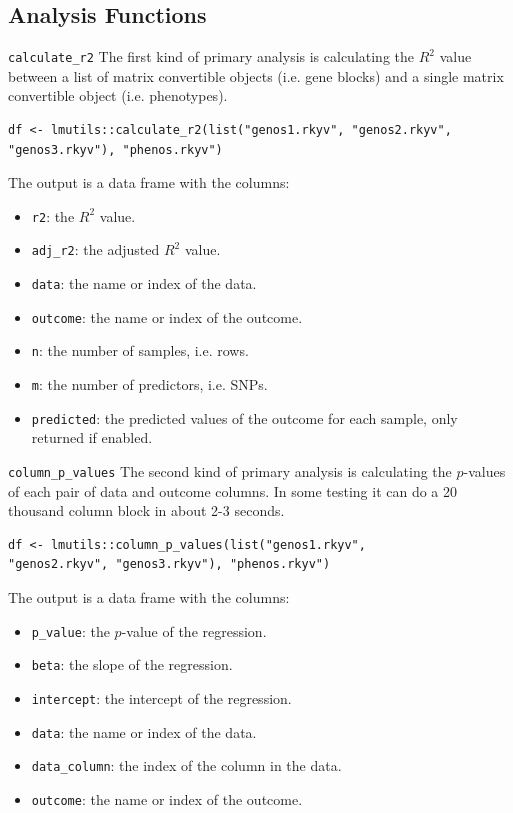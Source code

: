 \documentclass[10pt,handout]{beamer}
\begin{document}
\subsection{Analysis Functions}

\begin{frame}[fragile]{\texttt{calculate\_r2}}
  The first kind of primary analysis is calculating the $R^2$ value between a list of matrix convertible objects (i.e. gene blocks) and a single matrix convertible object (i.e. phenotypes).
\begin{verbatim}
df <- lmutils::calculate_r2(list("genos1.rkyv", "genos2.rkyv",
"genos3.rkyv"), "phenos.rkyv")
\end{verbatim}
  \pause
  The output is a data frame with the columns:
  \begin{itemize}[<+->]
    \item \texttt{r2}: the $R^2$ value.
    \item \texttt{adj\_r2}: the adjusted $R^2$ value.
    \item \texttt{data}: the name or index of the data.
    \item \texttt{outcome}: the name or index of the outcome.
    \item \texttt{n}: the number of samples, i.e. rows.
    \item \texttt{m}: the number of predictors, i.e. SNPs.
    \item \texttt{predicted}: the predicted values of the outcome for each sample, only returned if enabled.
  \end{itemize}
\end{frame}

\begin{frame}[fragile]{\texttt{column\_p\_values}}
  The second kind of primary analysis is calculating the $p$-values of each pair of data and outcome columns. In some testing it can do a 20 thousand column block in about 2-3 seconds.
  \begin{verbatim}
df <- lmutils::column_p_values(list("genos1.rkyv",
"genos2.rkyv", "genos3.rkyv"), "phenos.rkyv")
\end{verbatim}
  \pause
  The output is a data frame with the columns:
  \begin{itemize}[<+->]
    \item \texttt{p\_value}: the $p$-value of the regression.
    \item \texttt{beta}: the slope of the regression.
    \item \texttt{intercept}: the intercept of the regression.
    \item \texttt{data}: the name or index of the data.
    \item \texttt{data\_column}: the index of the column in the data.
    \item \texttt{outcome}: the name or index of the outcome.
  \end{itemize}
\end{frame}
\end{document}
